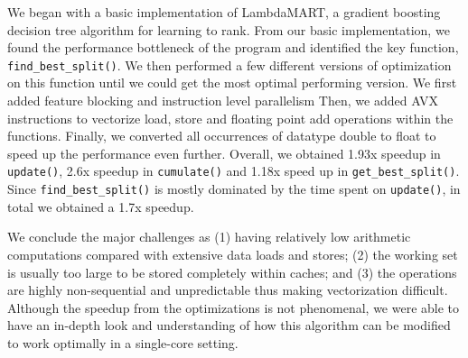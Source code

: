 We began with a basic implementation of LambdaMART, a gradient boosting decision tree algorithm for learning to rank. From our basic implementation, we found the performance bottleneck of the program and identified the key function, \texttt{find\_best\_split()}. We then performed a few different versions of optimization on this function until we could get the most optimal performing version. We first added feature blocking and instruction level parallelism
Then, we added AVX instructions to vectorize load, store and floating point add operations within the functions. Finally, we converted all occurrences of datatype double to float to speed up the performance even further. Overall, we obtained 1.93x speedup in \texttt{update()}, 2.6x speedup in \texttt{cumulate()} and 1.18x speed up in \texttt{get\_best\_split()}. Since \texttt{find\_best\_split()} is mostly dominated by the time spent on \texttt{update()}, in total we obtained a 1.7x speedup. 

We conclude the major challenges as (1) having relatively low arithmetic computations compared with extensive data loads and stores; (2) the working set is usually too large to be stored completely within caches; and (3) the operations are highly non-sequential and unpredictable thus making vectorization difficult.
Although the speedup from the optimizations is not phenomenal, we were able to have an in-depth look and understanding of how this algorithm can be modified to work optimally in a single-core setting.